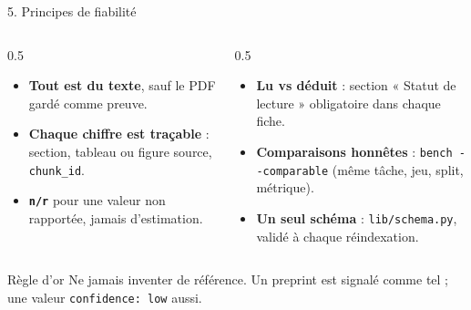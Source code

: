 \documentclass[aspectratio=169,11pt]{beamer}
\newcommand{\cmd}[1]{\texttt{\textcolor{blu}{#1}}}
\begin{document}
\begin{frame}{5. Principes de fiabilité}
  \begin{columns}[T]
    \begin{column}{0.5\textwidth}
      \begin{itemize}
        \item \textbf{Tout est du texte}, sauf le PDF gardé comme preuve.
        \item \textbf{Chaque chiffre est traçable} : section, tableau ou figure source, \texttt{chunk\_id}.
        \item \textbf{\texttt{n/r}} pour une valeur non rapportée, \alert{jamais d'estimation}.
      \end{itemize}
    \end{column}
    \begin{column}{0.5\textwidth}
      \begin{itemize}
        \item \textbf{Lu vs déduit} : section « Statut de lecture » obligatoire dans chaque fiche.
        \item \textbf{Comparaisons honnêtes} : \cmd{bench -{}-comparable} (même tâche, jeu, split, métrique).
        \item \textbf{Un seul schéma} : \texttt{lib/schema.py}, validé à chaque réindexation.
      \end{itemize}
    \end{column}
  \end{columns}
  \medskip
  \begin{alertblock}{Règle d'or}
    Ne jamais inventer de référence. Un preprint est signalé comme tel ; une valeur \texttt{confidence: low} aussi.
  \end{alertblock}
\end{frame}
\end{document}
